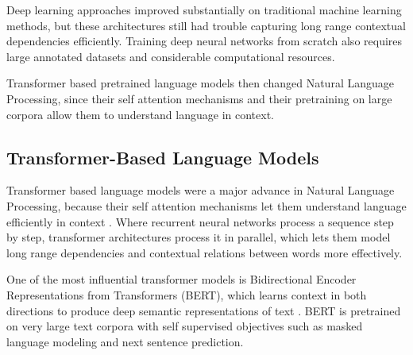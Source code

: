Deep learning approaches improved substantially on traditional machine learning methods, but these architectures still had trouble capturing long range contextual dependencies efficiently. Training deep neural networks from scratch also requires large annotated datasets and considerable computational resources.

Transformer based pretrained language models then changed Natural Language Processing, since their self attention mechanisms and their pretraining on large corpora allow them to understand language in context.

\subsection{Transformer-Based Language Models}

Transformer based language models were a major advance in Natural Language Processing, because their self attention mechanisms let them understand language efficiently in context \cite{vaswani2017attention}. Where recurrent neural networks process a sequence step by step, transformer architectures process it in parallel, which lets them model long range dependencies and contextual relations between words more effectively.

One of the most influential transformer models is Bidirectional Encoder Representations from Transformers (BERT), which learns context in both directions to produce deep semantic representations of text \cite{devlin2019bert}. BERT is pretrained on very large text corpora with self supervised objectives such as masked language modeling and next sentence prediction.


